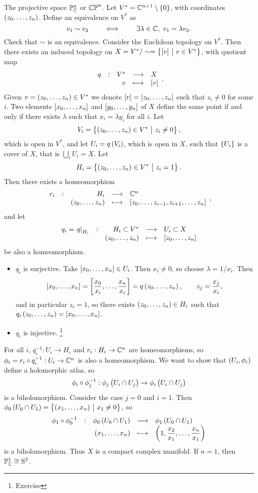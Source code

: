 \begin{example}
The projective space $ \mathbb{P}_{\mathbb{C}}^n $ or $ \mathbb{CP}^n $. Let $ V^* = \CC^{n + 1} \setminus \cbr{0} $, with coordinates $ \br{z_0, \dots, z_n} $. Define an equivalence on $ V^* $ as
$$ v_1 \sim v_2 \qquad \iff \qquad \exists \lambda \in \mathbb{C}, \ v_1 = \lambda v_2. $$
Check that $ \sim $ is an equivalence. Consider the Euclidean topology on $ V^* $. Then there exists an induced topology on $ X = V^* / \sim = \cbr{\sbr{v} \st v \in V^*} $, with quotient map
$$ \function[q]{V^*}{X}{v}{\sbr{v}}. $$
Given $ v = \br{z_0, \dots, z_n} \in V^* $ we denote $ \sbr{v} = \sbr{z_0, \dots, z_n} $ such that $ z_i \ne 0 $ for some $ i $. Two elements $ \sbr{x_0, \dots, x_n} $ and $ \sbr{y_0, \dots, y_n} $ of $ X $ define the same point if and only if there exists $ \lambda $ such that $ x_i = \lambda y_i $ for all $ i $. Let
$$ V_i = \cbr{\br{z_0, \dots, z_n} \in V^* \st z_i \ne 0}, $$
which is open in $ V^* $, and let $ U_i = q\br{V_i} $, which is open in $ X $, such that $ \cbr{U_i} $ is a cover of $ X $, that is $ \bigcup_i U_i = X $. Let
$$ H_i = \cbr{\br{z_0, \dots, z_n} \in V^* \st z_i = 1}. $$
Then there exists a homeomorphism
$$ \function[r_i]{H_i}{\CC^n}{\br{z_0, \dots, z_n}}{\sbr{z_0, \dots, z_{i - 1}, z_{i + 1}, \dots, z_n}}, $$
and let
$$ \function[q_i = \eval{q}_{H_i}]{H_i \subset V^*}{U_i \subset X}{\br{z_0, \dots, z_n}}{\sbr{z_0, \dots, z_n}} $$
be also a homeomorphism.

\pagebreak

\begin{itemize}
\item $ q_i $ is surjective. Take $ \sbr{x_0, \dots, x_n} \in U_i $. Then $ x_i \ne 0 $, so choose $ \lambda = 1 / x_i $. Then
$$ \sbr{x_0, \dots, x_n} = \sbr{\dfrac{x_0}{x_i}, \dots, \dfrac{x_n}{x_i}} = q\br{z_0, \dots, z_n}, \qquad z_j = \dfrac{x_j}{x_i}, $$
and in particular $ z_i = 1 $, so there exists $ \br{z_0, \dots, z_n} \in H_i $ such that $ q_i\br{z_0, \dots, z_n} = \sbr{x_0, \dots, x_n} $.
\item $ q_i $ is injective. \footnote{Exercise}
\end{itemize}
For all $ i $, $ q_i^{-1} : U_i \to H_i $ and $ r_i : H_i \to \mathbb{C}^n $ are homeomorphisms, so $ \phi_i = r_i \circ q_i^{-1} : U_i \to \mathbb{C}^n $ is also a homeomorphism. We want to show that $ \br{U_i, \phi_i} $ define a holomorphic atlas, so
$$ \phi_i \circ \phi_j^{-1} : \phi_j\br{U_i \cap U_j} \to \phi_i\br{U_i \cap U_j} $$
is a biholomorphism. Consider the case $ j = 0 $ and $ i = 1 $. Then $ \phi_0\br{U_0 \cap U_1} = \cbr{\br{x_1, \dots, x_n} \st x_1 \ne 0} $, so
$$ \function[\phi_1 \circ \phi_0^{-1}]{\phi_0\br{U_0 \cap U_1}}{\phi_1\br{U_0 \cap U_1}}{\br{x_1, \dots, x_n}}{\br{1, \dfrac{x_2}{x_1}, \dots, \dfrac{x_n}{x_1}}} $$
is a biholomorphism. Thus $ X $ is a compact complex manifold. If $ n = 1 $, then $ \mathbb{P}_{\mathbb{C}}^1 \cong \mathrm{S}^2 $.
\end{example}

